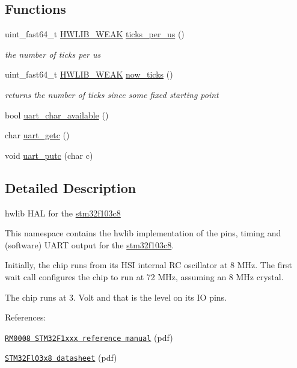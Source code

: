\subsection*{Functions}
\begin{DoxyCompactItemize}
\item 
uint\+\_\+fast64\+\_\+t \hyperlink{hwlib-defines_8hpp_a04be4340016df60d6636c1d1c6d94fc9}{H\+W\+L\+I\+B\+\_\+\+W\+E\+AK} \hyperlink{namespacestm32f103c8_a7690d875e87715532777680634201060}{ticks\+\_\+per\+\_\+us} ()
\begin{DoxyCompactList}\small\item\em the number of ticks per us \end{DoxyCompactList}\item 
uint\+\_\+fast64\+\_\+t \hyperlink{hwlib-defines_8hpp_a04be4340016df60d6636c1d1c6d94fc9}{H\+W\+L\+I\+B\+\_\+\+W\+E\+AK} \hyperlink{namespacestm32f103c8_a3cee8ad2019972eede2f90456d5eb9e0}{now\+\_\+ticks} ()
\begin{DoxyCompactList}\small\item\em returns the number of ticks since some fixed starting point \end{DoxyCompactList}\item 
bool \hyperlink{namespacestm32f103c8_ab6a4d37dccd20d9ddd6ef943fffeb114}{uart\+\_\+char\+\_\+available} ()
\item 
char \hyperlink{namespacestm32f103c8_ad5b6e620a169eb8f233dc3f158e15ac7}{uart\+\_\+getc} ()
\item 
void \hyperlink{namespacestm32f103c8_a3b4365830ed2e5f66b80cac899ed29d4}{uart\+\_\+putc} (char c)
\end{DoxyCompactItemize}


\subsection{Detailed Description}
hwlib H\+AL for the \hyperlink{namespacestm32f103c8}{stm32f103c8} 

This namespace contains the hwlib implementation of the pins, timing and (software) U\+A\+RT output for the \hyperlink{namespacestm32f103c8}{stm32f103c8}.

Initially, the chip runs from its H\+SI internal RC oscillator at 8 M\+Hz. The first wait call configures the chip to run at 72 M\+Hz, assuming an 8 M\+Hz crystal.

The chip runs at 3. Volt and that is the level on its IO pins.

References\+:
\begin{DoxyItemize}
\item \href{http://www.st.com/content/ccc/resource/technical/document/reference_manual/59/b9/ba/7f/11/af/43/d5/CD00171190.pdf/files/CD00171190.pdf/jcr:content/translations/en.CD00171190.pdf}{\tt R\+M0008 S\+T\+M32\+F1xxx reference manual} (pdf)
\item \href{http://www.st.com/content/ccc/resource/technical/document/datasheet/33/d4/6f/1d/df/0b/4c/6d/CD00161566.pdf/files/CD00161566.pdf/jcr:content/translations/en.CD00161566.pdf}{\tt S\+T\+M32\+Fl03x8 datasheet} (pdf) 
\end{DoxyItemize}

